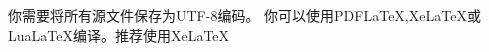 \documentclass[UTF8]{ctexart}
\begin{document}
	你需要将所有源文件保存为UTF-8编码。
	你可以使用PDFLaTeX,XeLaTeX或LuaLaTeX编译。推荐使用XeLaTeX
\end{document}
